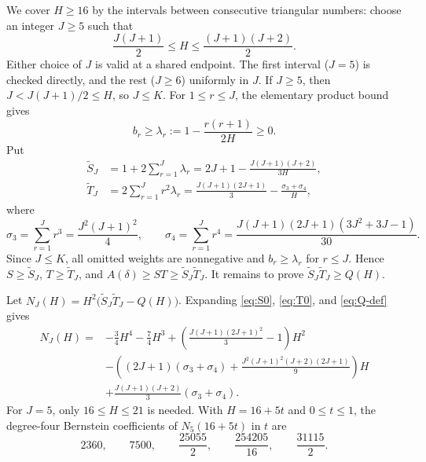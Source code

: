\documentclass[ECP,preprint]{ejpecp}
\begin{document}
We cover $H\geq16$ by the intervals between consecutive triangular numbers:
choose an integer $J\geq5$ such that
\begin{equation}\label{eq:triangular-cell}
  \frac{J(J+1)}2\leq H\leq\frac{(J+1)(J+2)}2.
\end{equation}
Either choice of $J$ is valid at a shared endpoint. The first interval
($J=5$) is checked directly, and the rest ($J\geq6$) uniformly in $J$. If
$J\geq5$, then $J<J(J+1)/2\leq H$, so $J\leq K$. For $1\leq r\leq J$, the elementary product
bound gives
\begin{equation}\label{eq:bonferroni}
  b_r\geq\lambda_r:=1-\frac{r(r+1)}{2H}\geq0.
\end{equation}
Put
\begin{align}
  \tilde S_J&=1+2\sum_{r=1}^J \lambda_r
  =2J+1-\frac{J(J+1)(J+2)}{3H},
  \label{eq:S0}\\
  \tilde T_J&=2\sum_{r=1}^Jr^2\lambda_r
  =\frac{J(J+1)(2J+1)}3-\frac{\sigma_3+\sigma_4}{H},
  \label{eq:T0}
\end{align}
where
\[
  \sigma_3=\sum_{r=1}^Jr^3=\frac{J^2(J+1)^2}{4},
  \qquad
  \sigma_4=\sum_{r=1}^Jr^4=\frac{J(J+1)(2J+1)(3J^2+3J-1)}{30}.
\]
Since $J\leq K$, all omitted weights are nonnegative and $b_r\geq\lambda_r$
for $r\leq J$. Hence $S\geq\tilde S_J$, $T\geq\tilde T_J$, and
$A(\delta)\geq ST\geq\tilde S_J\tilde T_J$. It remains to prove
$\tilde S_J\tilde T_J\geq Q(H)$.

Let $N_J(H)=H^2\bigl(\tilde S_J\tilde T_J-Q(H)\bigr)$. Expanding
\eqref{eq:S0}, \eqref{eq:T0}, and \eqref{eq:Q-def} gives
\begin{align*}
  N_J(H)={}&-\frac34H^4-\frac74H^3
  +\left(\frac{J(J+1)(2J+1)^2}{3}-1\right)H^2\\
  &-\left((2J+1)(\sigma_3+\sigma_4)
    +\frac{J^2(J+1)^2(J+2)(2J+1)}{9}\right)H\\
  &+\frac{J(J+1)(J+2)}{3}(\sigma_3+\sigma_4).
\end{align*}
For $J=5$, only $16\leq H\leq21$ is needed. With $H=16+5t$ and
$0\leq t\leq1$, the degree-four Bernstein coefficients of $N_5(16+5t)$ in $t$
are
\[
  2360,\qquad 7500,\qquad \frac{25055}{2},\qquad
  \frac{254205}{16},\qquad \frac{31115}{2}.
\]
\end{document}
